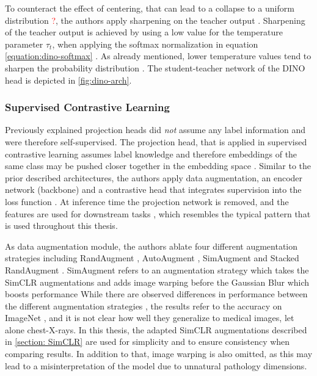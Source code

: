 To counteract the effect of centering, that can lead to a collapse to a uniform distribution \textcolor{red}{?}, the authors apply sharpening on the teacher output \textcolor{red}{\citep{Caron2021}}.
Sharpening of the teacher output is achieved by using a low value for the temperature parameter $\tau_t$, when applying the softmax normalization in equation \ref{equation:dino-softmax} \citep{Caron2021}.
As already mentioned, lower temperature values tend to sharpen the probability distribution \textcolor{red}{\citep{Hinton2015}}.
The student-teacher network of the DINO head is depicted in \ref{fig:dino-arch}.
\subsubsection{Supervised Contrastive Learning}
\label{section: supervised-contrastive-learning}
Previously explained projection heads did \textit{not} assume any label information and were therefore self-supervised.
The projection head, that is applied in supervised contrastive learning assumes label knowledge and therefore embeddings of the same class may be pushed closer together in the embedding space \citep{Khosla2020}.
Similar to the prior described architectures, the authors apply data augmentation, an encoder network (backbone) and a contrastive head that integrates supervision into the loss function \citep{Khosla2020}.
At inference time the projection network is removed, and the features are used for downstream tasks \citep{Khosla2020}, which resembles the typical pattern that is used throughout this thesis.
\par
As data augmentation module, the authors ablate four different augmentation strategies including RandAugment \citep{Cubuk2019a}, AutoAugment \citep{Cubuk2019b}, SimAugment \citep{Chen2020} and Stacked RandAugment \citep{Tian2020}.
SimAugment refers to an augmentation strategy which takes the SimCLR augmentations and adds image warping before the Gaussian Blur which boosts performance \citep{Khosla2020}
While there are observed differences in performance between the different augmentation strategies \citep{Khosla2020}, the results refer to the accuracy on ImageNet \citep{Deng2009}, and it is not clear how well they generalize to medical images, let alone chest-X-rays.
In this thesis, the adapted SimCLR augmentations described in \ref{section: SimCLR} are used for simplicity and to ensure consistency when comparing results.
In addition to that, image warping is also omitted, as this may lead to a misinterpretation of the model due to unnatural pathology dimensions.
